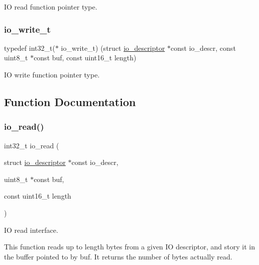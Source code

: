 IO read function pointer type. 

\mbox{\label{group__doc__driver__hal__helper__io_gacb03c48993a6786f00946c196c40add1}} 
\subsubsection{\texorpdfstring{io\+\_\+write\+\_\+t}{io\_write\_t}}
{\footnotesize\ttfamily typedef int32\+\_\+t($\ast$ io\+\_\+write\+\_\+t) (struct \hyperlink{structio__descriptor}{io\+\_\+descriptor} $\ast$const io\+\_\+descr, const uint8\+\_\+t $\ast$const buf, const uint16\+\_\+t length)}



IO write function pointer type. 



\subsection{Function Documentation}
\mbox{\label{group__doc__driver__hal__helper__io_gaf5e8722129933fa8e014144fd7505be6}} 
\subsubsection{\texorpdfstring{io\+\_\+read()}{io\_read()}}
{\footnotesize\ttfamily int32\+\_\+t io\+\_\+read (\begin{DoxyParamCaption}\item[{struct \hyperlink{structio__descriptor}{io\+\_\+descriptor} $\ast$const}]{io\+\_\+descr,  }\item[{uint8\+\_\+t $\ast$const}]{buf,  }\item[{const uint16\+\_\+t}]{length }\end{DoxyParamCaption})}



IO read interface. 

This function reads up to {\ttfamily length} bytes from a given IO descriptor, and story it in the buffer pointed to by {\ttfamily buf}. It returns the number of bytes actually read.


